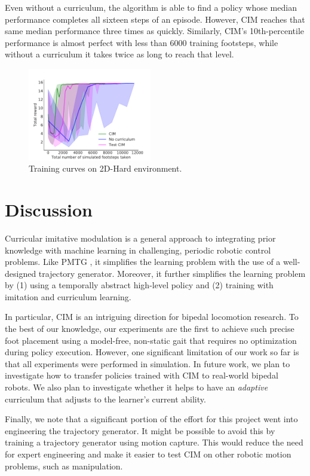 \documentclass[conference]{IEEEtran}
\begin{document}
Even without a curriculum, the algorithm is able to find a policy whose median performance completes all sixteen steps of an episode.
However, CIM reaches that same median performance three times as quickly.
Similarly, CIM's 10th-percentile performance is almost perfect with less than 6000 training footsteps, while without a curriculum it takes twice as long to reach that level.

\begin{figure}
  \includegraphics[width=0.48\textwidth]{../figures/nocur_baseline.pdf}
  \caption{\label{fig:nocur baseline} Training curves on 2D-Hard environment.}
\end{figure}

\section{Discussion}

Curricular imitative modulation is a general approach to integrating prior knowledge with machine learning in challenging, periodic robotic control problems.
Like PMTG \citep{iscen2018pmtg}, it simplifies the learning problem with the use of a well-designed trajectory generator.
Moreover, it further simplifies the learning problem by (1) using a temporally abstract high-level policy and (2) training with imitation and curriculum learning.

In particular, CIM is an intriguing direction for bipedal locomotion research.
To the best of our knowledge, our experiments are the first to achieve such precise foot placement
using a model-free, non-static gait that requires no optimization during policy execution.
However, one significant limitation of our work so far is that all experiments were performed in simulation.
In future work, we plan to investigate how to transfer policies trained with CIM to real-world bipedal robots.
We also plan to investigate whether it helps to have an \emph{adaptive} curriculum that adjusts to the learner's current ability.

Finally, we note that a significant portion of the effort for this project went into engineering the trajectory generator.
It might be possible to avoid this by training a trajectory generator using motion capture.
This would reduce the need for expert engineering and make it easier to test CIM on other robotic motion problems, such as manipulation.
\end{document}
